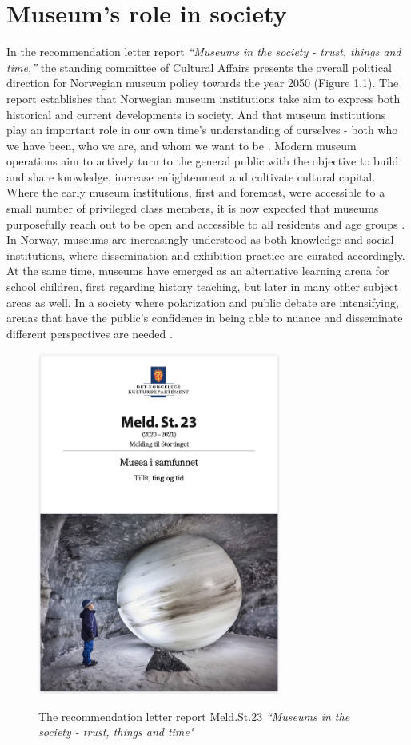 \section{Museum's role in society}

In the recommendation letter report \emph{“Museums in the society - trust, things and time,”} the standing committee of Cultural Affairs presents the overall political direction for Norwegian museum policy towards the year 2050 (Figure 1.1). The report establishes that Norwegian museum institutions take aim to express both historical and current developments in society. And that museum institutions play an important role in our own time’s understanding of ourselves - both who we have been, who we are, and whom we want to be \autocite[p. 7]{melding23}. Modern museum operations aim to actively turn to the general public with the objective to build and share knowledge, increase enlightenment and cultivate cultural capital. Where the early museum institutions, first and foremost, were accessible to a small number of privileged class members, it is now expected that museums purposefully reach out to be open and accessible to all residents and age groups \autocite[p. 14]{melding23}. In Norway, museums are increasingly understood as both knowledge and social institutions, where dissemination and exhibition practice are curated accordingly. At the same time, museums have emerged as an alternative learning arena for school children, first regarding history teaching, but later in many other subject areas as well. In a society where polarization and public debate are intensifying, arenas that have the public's confidence in being able to nuance and disseminate different perspectives are needed \autocite[p. 7]{melding23}.

\begin{figure}[H]
\centering
\includegraphics[width=8cm]{pictures/Introduction/stortingsmelding_hoykant.png}
\caption{The recommendation letter report Meld.St.23 \emph{“Museums in the society - trust, things and time"}} {\autocite[p. 1]{melding23}}
\end{figure}

